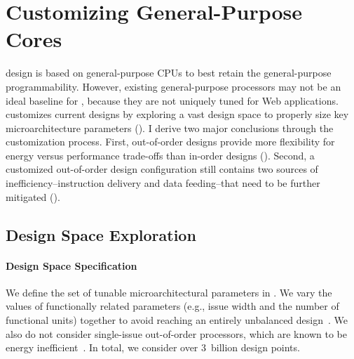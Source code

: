 
\section{Customizing General-Purpose Cores}
\label{sec:arch:customization}

\webcore design is based on general-purpose CPUs to best retain the general-purpose programmability. However, existing general-purpose processors may not be an ideal baseline for \webcore, because they are not uniquely tuned for Web applications. \webcore customizes current designs by exploring a vast design space to properly size key microarchitecture parameters (). I derive two major conclusions through the customization process. First, out-of-order designs provide more flexibility for energy versus performance trade-offs than in-order designs (). Second, a customized out-of-order design configuration still contains two sources of inefficiency--instruction delivery and data feeding--that need to be further mitigated ().

\subsection{Design Space Exploration}
\label{sec:arch:customization:dse}

\paragraph{Design Space Specification} We define the set of tunable microarchitectural parameters in . We vary the values of functionally related parameters (e.g., issue width and the number of functional units) together to avoid reaching an entirely unbalanced design~\cite{ilp2}. We also do not consider single-issue out-of-order processors, which are known to be energy inefficient~\cite{marginal}. In total, we consider over 3~billion design points.

